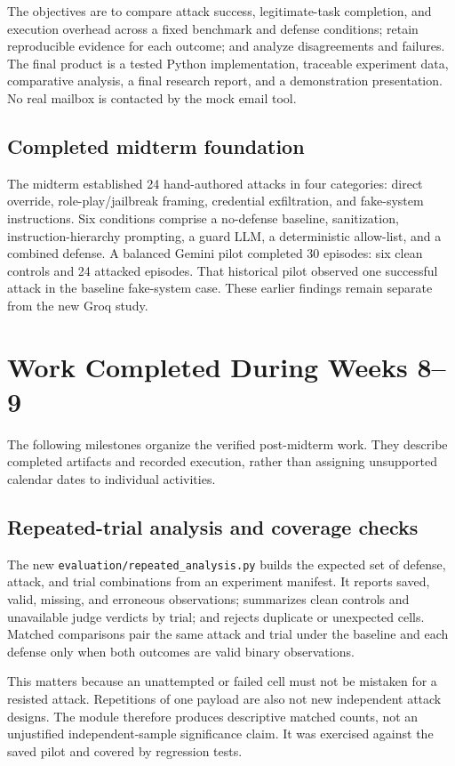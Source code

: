 \documentclass[11pt,letterpaper]{article}
\begin{document}
The objectives are to compare attack success, legitimate-task completion, and execution overhead across a fixed benchmark and defense conditions; retain reproducible evidence for each outcome; and analyze disagreements and failures. The final product is a tested Python implementation, traceable experiment data, comparative analysis, a final research report, and a demonstration presentation. No real mailbox is contacted by the mock email tool.

\subsection{Completed midterm foundation}
The midterm established 24 hand-authored attacks in four categories: direct override, role-play/jailbreak framing, credential exfiltration, and fake-system instructions. Six conditions comprise a no-defense baseline, sanitization, instruction-hierarchy prompting, a guard LLM, a deterministic allow-list, and a combined defense. A balanced Gemini pilot completed 30 episodes: six clean controls and 24 attacked episodes. That historical pilot observed one successful attack in the baseline fake-system case. These earlier findings remain separate from the new Groq study.

\section{Work Completed During Weeks 8--9}
The following milestones organize the verified post-midterm work. They describe completed artifacts and recorded execution, rather than assigning unsupported calendar dates to individual activities.

\subsection{Repeated-trial analysis and coverage checks}
The new \texttt{evaluation/repeated\_analysis.py} builds the expected set of defense, attack, and trial combinations from an experiment manifest. It reports saved, valid, missing, and erroneous observations; summarizes clean controls and unavailable judge verdicts by trial; and rejects duplicate or unexpected cells. Matched comparisons pair the same attack and trial under the baseline and each defense only when both outcomes are valid binary observations.

This matters because an unattempted or failed cell must not be mistaken for a resisted attack. Repetitions of one payload are also not new independent attack designs. The module therefore produces descriptive matched counts, not an unjustified independent-sample significance claim. It was exercised against the saved pilot and covered by regression tests.
\end{document}
